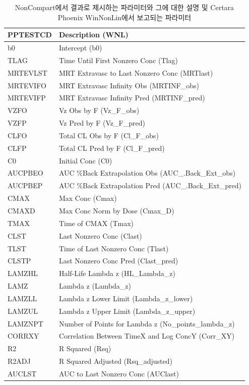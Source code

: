 \documentclass[
  11pt,
  krantz2, a4paper, twoside]{krantz}
\theoremstyle{definition}
\theoremstyle{definition}
\theoremstyle{definition}
\theoremstyle{definition}
\theoremstyle{remark}
\begin{document}
\begin{longtable}[t]{ll}
\caption{\label{tab:rptcfg}NonCompart에서 결과로 제시하는 파라미터와 그에 대한 설명 및 Certara Phoenix WinNonLin에서 보고되는 파라미터}\\
\toprule
PPTESTCD & Description (WNL)\\
\midrule
b0 & Intercept (b0)\\
TLAG & Time Until First Nonzero Conc (Tlag)\\
MRTEVLST & MRT Extravasc to Last Nonzero Conc (MRTlast)\\
MRTEVIFO & MRT Extravasc Infinity Obs (MRTINF\_obs)\\
MRTEVIFP & MRT Extravasc Infinity Pred (MRTINF\_pred)\\
\addlinespace
VZFO & Vz Obs by F (Vz\_F\_obs)\\
VZFP & Vz Pred by F (Vz\_F\_pred)\\
CLFO & Total CL Obs by F (Cl\_F\_obs)\\
CLFP & Total CL Pred by F (Cl\_F\_pred)\\
C0 & Initial Conc (C0)\\
\addlinespace
AUCPBEO & AUC \%Back Extrapolation Obs (AUC\_.Back\_Ext\_obs)\\
AUCPBEP & AUC \%Back Extrapolation Pred (AUC\_.Back\_Ext\_pred)\\
CMAX & Max Conc (Cmax)\\
CMAXD & Max Conc Norm by Dose (Cmax\_D)\\
TMAX & Time of CMAX (Tmax)\\
\addlinespace
CLST & Last Nonzero Conc (Clast)\\
TLST & Time of Last Nonzero Conc (Tlast)\\
CLSTP & Last Nonzero Conc Pred (Clast\_pred)\\
LAMZHL & Half-Life Lambda z (HL\_Lambda\_z)\\
LAMZ & Lambda z (Lambda\_z)\\
\addlinespace
LAMZLL & Lambda z Lower Limit (Lambda\_z\_lower)\\
LAMZUL & Lambda z Upper Limit (Lambda\_z\_upper)\\
LAMZNPT & Number of Points for Lambda z (No\_points\_lambda\_z)\\
CORRXY & Correlation Between TimeX and Log ConcY (Corr\_XY)\\
R2 & R Squared (Rsq)\\
\addlinespace
R2ADJ & R Squared Adjusted (Rsq\_adjusted)\\
AUCLST & AUC to Last Nonzero Conc (AUClast)\\

\end{longtable}
\end{document}
